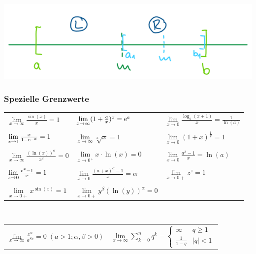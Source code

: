 			\includegraphics[width=0.9\linewidth]{Bilder/bisektion}
		
		\subsubsection{Spezielle Grenzwerte}	
			\begin{tabular}{lll}
				$\lim\limits_{x \to \infty} \frac{\sin(x)}{x} = 1$ &  $\lim\limits_{x \to \infty} (1 + \frac{a}{x})^x = \mathrm{e}^a$ & $\lim\limits_{x \to 0} \frac{\log_a(x+1)}{x} = \frac{1}{\ln(a)}$  \\
				\\
				$\lim\limits_{x \to 1} \frac{x}{1-\mathrm{e}^{-x}} = 1$ & $\lim\limits_{x \to \infty} \sqrt[x]{x} = 1$  & $\lim\limits_{x \to 0} (1+x)^{\frac{1}{x}} = 1$ \\
				\\
				$\lim\limits_{x \to \infty} \frac{(\ln(x))^\alpha}{x^\beta} = 0$ & $\lim\limits_{x \to 0^+} x \cdot \ln(x) = 0$  & $\lim\limits_{x \to 0} \frac{a^x -1}{x} = \ln(a)$ \\
				\\
				$\lim\limits_{x \to 0} \frac{\mathrm{e}^x - 1}{x} = 1$ & $\lim\limits_{x \to 0} \frac{(a+x)^\alpha -1}{x} = \alpha$  & $\lim\limits_{x \to 0+} z^z = 1$ \\
				\\
				$\lim\limits_{x \to 0+} x^{\sin(x)} = 1$ & $\lim\limits_{x \to 0+} y^{\beta} (\ln(y))^{\alpha} = 0 $ &  \\
			\end{tabular}
			\\
			\begin{tabular}{ll}
				$\lim\limits_{x \to \infty} \frac{x^\alpha}{a^{\beta x}} = 0 \; (a > 1; \alpha, \beta > 0)$  & $\lim\limits_{x \to \infty} \sum\limits _{k=0}^n q^k = 
					\begin{cases}			
						\infty & q \geq 1 \\
						\frac{1}{1-q} & \vert q \vert < 1
					\end{cases} $ \\ 
			\end{tabular}

